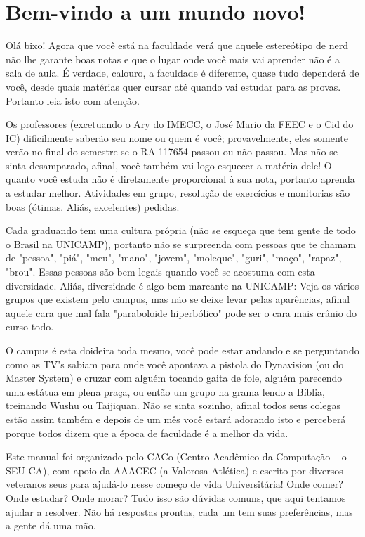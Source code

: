 \documentclass[a4paper,10pt]{article}
\begin{document}
\section{Bem-vindo a um mundo novo!}
Olá bixo! Agora que você está na faculdade verá que aquele estereótipo de nerd
não lhe garante boas notas e que o lugar onde você mais vai aprender não
é a sala de aula. É verdade, calouro, a faculdade é diferente, quase tudo
dependerá de você, desde quais matérias quer cursar até quando vai estudar para
as provas. Portanto leia isto com atenção.

Os professores (excetuando o Ary do IMECC, o José Mario da FEEC e o Cid do IC)
dificilmente saberão seu nome ou quem é você; provavelmente, eles somente verão
no final do semestre se o RA 117654  passou ou não passou. Mas não se sinta
desamparado, afinal, você também vai logo esquecer a matéria dele! O quanto você
estuda não é diretamente proporcional à sua nota, portanto aprenda a estudar
melhor. Atividades em grupo, resolução de exercícios e monitorias são boas
(ótimas. Aliás, excelentes) pedidas.

Cada graduando tem uma cultura própria (não se esqueça que tem gente de todo
o Brasil na UNICAMP), portanto não se surpreenda com pessoas que te chamam de
"pessoa", "piá", "meu", "mano", "jovem", "moleque", "guri", "moço", "rapaz",
"brou". Essas pessoas são bem legais quando você se acostuma com esta
diversidade. Aliás, diversidade é algo bem marcante na UNICAMP: Veja os vários
grupos que existem pelo campus, mas não se deixe levar pelas aparências, afinal
aquele cara que mal fala "paraboloide hiperbólico" pode ser o cara mais crânio
do curso todo.

O campus é esta doideira toda mesmo, você pode estar andando e se perguntando
como as TV's sabiam para onde você apontava a pistola do Dynavision (ou do
Master System) e cruzar com alguém tocando gaita de fole, alguém parecendo uma
estátua em plena praça, ou então um grupo na grama lendo a Bíblia, treinando
Wushu ou Taijiquan. Não se sinta sozinho, afinal todos seus colegas estão assim
também e depois de um mês você estará adorando isto e perceberá porque todos
dizem que a época de faculdade é a melhor da vida.

Este manual foi organizado pelo CACo (Centro Acadêmico da Computação -- o SEU
CA), com apoio da AAACEC (a Valorosa Atlética) e escrito por diversos veteranos
seus para ajudá-lo nesse começo de vida Universitária! Onde comer? Onde estudar?
Onde morar? Tudo isso são dúvidas comuns, que aqui tentamos ajudar a resolver.
Não há respostas prontas, cada um tem suas preferências, mas a gente dá uma mão.
\end{document}
